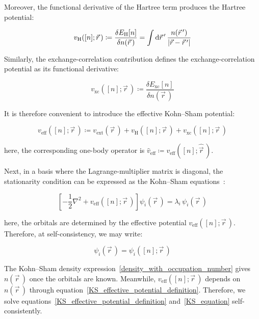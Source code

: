 Moreover, the functional derivative of the Hartree term produces the Hartree potential:

\begin{equation}
    v_\mathrm{H}([n];\vec{r}\,)
    \coloneqq \frac{\delta E_\mathrm{H}[n]}{\delta n(\vec{r}\,)}
    = \int\mathrm{d}{\vec{r}\,'}\,\frac{n(\vec{r}\,')}{|\vec{r}-\vec{r}\,'|}
\label{Hartree_potential_KS_definition}
\end{equation}

Similarly, the exchange-correlation contribution defines the exchange-correlation potential as its functional derivative:

\begin{equation}
    v_\mathrm{xc}([n];\vec{r}\,)\coloneqq\frac{\delta E_\mathrm{xc}[n]}{\delta n(\vec{r}\,)}
\label{xc_potential_definition}
\end{equation}

It is therefore convenient to introduce the effective Kohn--Sham potential:

\begin{equation}
    v_\mathrm{eff}([n];\vec{r}\,)
    \coloneqq v_\mathrm{ext}(\vec{r}\,)
    + v_\mathrm{H}([n];\vec{r}\,)
    + v_\mathrm{xc}([n];\vec{r}\,)
\label{KS_effective_potential_definition}
\end{equation}

here, the corresponding one-body operator is $\hat{v}_\mathrm{eff}\coloneqq v_\mathrm{eff}([n];\hat{\vec{r}}\,)$.

Next, in a basis where the Lagrange-multiplier matrix is diagonal,
the stationarity condition can be expressed as the Kohn--Sham equations~\cite{kohn1965self}:

\begin{equation}
    \left[-\frac{1}{2}\nabla^2+v_\mathrm{eff}([n];\vec{r}\,)\right]\psi_i(\vec{r}\,)
    = \lambda_i\,\psi_i(\vec{r}\,)
\label{KS_equation}
\end{equation}

here, the orbitals are determined by the effective potential $v_\mathrm{eff}([n];\vec{r}\,)$.
Therefore, at self-consistency, we may write:

\begin{equation}
    \psi_i(\vec{r}\,)=\psi_i([n];\vec{r}\,)
\label{KS_orbitals_as_density_functionals}
\end{equation}

The Kohn--Sham density expression~\eqref{density_with_occupation_number} gives $n(\vec{r}\,)$ once the orbitals are known.
Meanwhile, $v_\mathrm{eff}([n];\vec{r}\,)$ depends on $n(\vec{r}\,)$ through equation~\eqref{KS_effective_potential_definition}.
Therefore, we solve equations~\eqref{KS_effective_potential_definition} and~\eqref{KS_equation} self-consistently.

